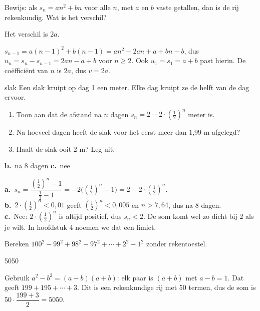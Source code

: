 \begin{oefeningen}
\begin{oefening}[3]
Bewijs: als $s_n = an^2 + bn$ voor alle $n$, met $a$ en $b$ vaste getallen, dan is de rij rekenkundig. Wat is het verschil?
\begin{solution}
Het verschil is $2a$.
\end{solution}
\begin{fullsolution}
$s_{n-1}=a(n-1)^2+b(n-1)=an^2-2an+a+bn-b$, dus $u_n=s_n-s_{n-1}=2an-a+b$ voor $n\geqslant 2$. Ook $u_1=s_1=a+b$ past hierin. De coëfficiënt van $n$ is $2a$, dus $v=2a$.
\end{fullsolution}
\end{oefening}

\begin{oefening}[3]
\begin{metprent}{slak}
Een slak kruipt op dag 1 een meter. Elke dag kruipt ze de helft van de dag ervoor.
\begin{enumerate}
  \item Toon aan dat de afstand na $n$ dagen $s_n = 2 - 2 \cdot (\tfrac12)^n$ meter is.
  \item Na hoeveel dagen heeft de slak voor het eerst meer dan 1,99 m afgelegd?
  \item Haalt de slak ooit 2 m? Leg uit.
\end{enumerate}
\end{metprent}
\begin{solution}
\textbf{b.}~na 8 dagen \quad \textbf{c.}~nee
\end{solution}
\begin{fullsolution}
\textbf{a.}~$s_n=\dfrac{(\tfrac12)^n-1}{\tfrac12-1}=-2\bigl((\tfrac12)^n-1\bigr)=2-2\cdot(\tfrac12)^n$.\\
\textbf{b.}~$2\cdot(\tfrac12)^n<0{,}01$ geeft $(\tfrac12)^n<0{,}005$ en $n>7{,}64$, dus na 8 dagen.\\
\textbf{c.}~Nee: $2\cdot(\tfrac12)^n$ is altijd positief, dus $s_n<2$. De som komt wel zo dicht bij 2 als je wilt. In hoofdstuk 4 noemen we dat een limiet.
\end{fullsolution}
\end{oefening}

\begin{oefening}[3]
Bereken $100^2 - 99^2 + 98^2 - 97^2 + \cdots + 2^2 - 1^2$ zonder rekentoestel.
\begin{solution}
5050
\end{solution}
\begin{fullsolution}
Gebruik $a^2-b^2=(a-b)(a+b)$: elk paar is $(a+b)$ met $a-b=1$. Dat geeft $199+195+\cdots+3$. Dit is een rekenkundige rij met 50 termen, dus de som is $50\cdot\dfrac{199+3}{2}=5050$.
\end{fullsolution}
\end{oefening}


\end{oefeningen}
